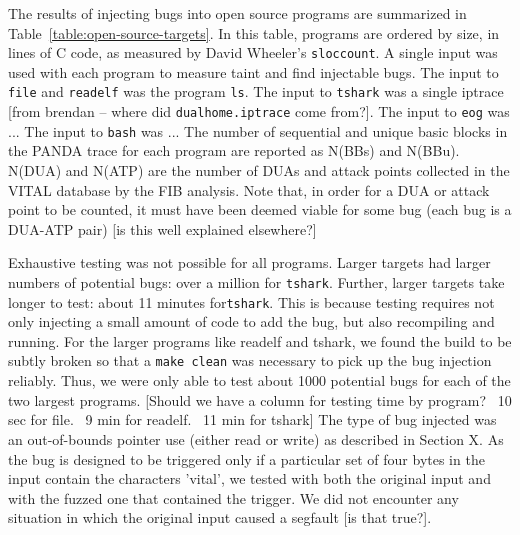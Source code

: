 The results of injecting bugs into open source programs are summarized in Table~\ref{table:open-source-targets}.
In this table, programs are ordered by size, in lines of C code, as measured by David Wheeler's \verb+sloccount+.  %
A single input was used with each program to measure taint and find injectable bugs.
The input to \verb+file+ and \verb+readelf+ was the program \verb+ls+.
The input to \verb+tshark+ was a single iptrace [from brendan -- where did \verb+dualhome.iptrace+ come from?]. 
The input to \verb+eog+ was ...
The input to \verb+bash+ was ...
The number of sequential and unique basic blocks in the PANDA trace for each program are reported as N(BBs) and N(BBu).
N(DUA) and N(ATP) are the number of DUAs and attack points collected in the VITAL database by the FIB analysis.
Note that, in order for a DUA or attack point to be counted, it must have been deemed viable for some bug (each bug is a DUA-ATP pair) [is this well explained elsewhere?]

Exhaustive testing was not possible for all programs.  
Larger targets had larger numbers of potential bugs: over a million for \verb+tshark+.
Further, larger targets take longer to test: about 11 minutes for\verb+tshark+.
This is because testing requires not only injecting a small amount of code to add the bug, but also recompiling and running.
For the larger programs like readelf and tshark, we found the build to be subtly broken so that a \verb+make clean+ was necessary to pick up the bug injection reliably.
Thus, we were only able to test about 1000 potential bugs for each of the two largest programs. 
[Should we have a column for testing time by program?  ~10 sec for file.  ~9 min for readelf.  ~11 min for tshark]
The type of bug injected was an out-of-bounds pointer use (either read or write) as described in Section X.
As the bug is designed to be triggered only if a particular set of four bytes in the input contain the characters 'vital',
we tested with both the original input and with the fuzzed one that contained the trigger. 
We did not encounter any situation in which the original input caused a segfault [is that true?].

